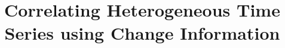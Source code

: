 \documentclass{sig-alternate}
\begin{document}
%

\title{Correlating Heterogeneous Time Series using Change Information}
 

%
%
%
%
%
\end{document}
